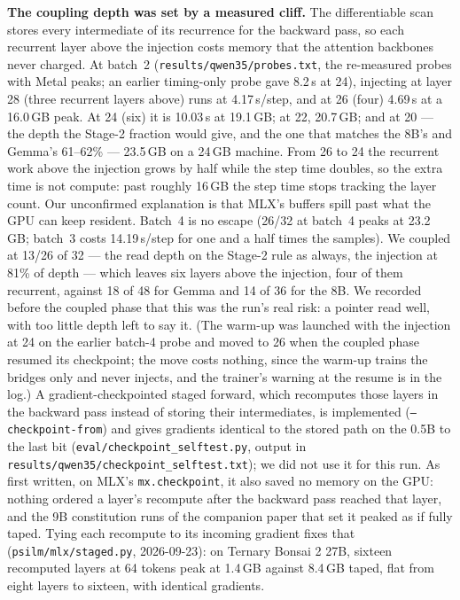 \documentclass[11pt]{article}
\newcommand{\code}[1]{\texttt{#1}}
\begin{document}
\textbf{The coupling depth was set by a measured cliff.} The differentiable scan stores every intermediate of its recurrence for the backward pass, so each recurrent layer above the injection costs memory that the attention backbones never charged. At batch~2 (\code{results/qwen35/probes.txt}, the re-measured probes with Metal peaks; an earlier timing-only probe gave 8.2\,s at 24), injecting at layer 28 (three recurrent layers above) runs at 4.17\,s/step, and at 26 (four) 4.69\,s at a 16.0\,GB peak. At 24 (six) it is 10.03\,s at 19.1\,GB; at 22, 20.7\,GB; and at 20 --- the depth the Stage-2 fraction would give, and the one that matches the 8B's and Gemma's 61--62\% --- 23.5\,GB on a 24\,GB machine. From 26 to 24 the recurrent work above the injection grows by half while the step time doubles, so the extra time is not compute: past roughly 16\,GB the step time stops tracking the layer count. Our unconfirmed explanation is that MLX's buffers spill past what the GPU can keep resident. Batch~4 is no escape (26/32 at batch~4 peaks at 23.2\,GB; batch~3 costs 14.19\,s/step for one and a half times the samples). We coupled at 13/26 of 32 --- the read depth on the Stage-2 rule as always, the injection at 81\% of depth --- which leaves six layers above the injection, four of them recurrent, against 18 of 48 for Gemma and 14 of 36 for the 8B. We recorded before the coupled phase that this was the run's real risk: a pointer read well, with too little depth left to say it. (The warm-up was launched with the injection at 24 on the earlier batch-4 probe and moved to 26 when the coupled phase resumed its checkpoint; the move costs nothing, since the warm-up trains the bridges only and never injects, and the trainer's warning at the resume is in the log.) A gradient-checkpointed staged forward, which recomputes those layers in the backward pass instead of storing their intermediates, is implemented (\code{--checkpoint-from}) and gives gradients identical to the stored path on the 0.5B to the last bit (\code{eval/checkpoint\_selftest.py}, output in \code{results/qwen35/checkpoint\_selftest.txt}); we did not use it for this run. As first written, on MLX's \code{mx.checkpoint}, it also saved no memory on the GPU: nothing ordered a layer's recompute after the backward pass reached that layer, and the 9B constitution runs of the companion paper that set it peaked as if fully taped. Tying each recompute to its incoming gradient fixes that (\code{psilm/mlx/staged.py}, 2026-09-23): on Ternary Bonsai 2 27B, sixteen recomputed layers at 64 tokens peak at 1.4\,GB against 8.4\,GB taped, flat from eight layers to sixteen, with identical gradients.
\end{document}

